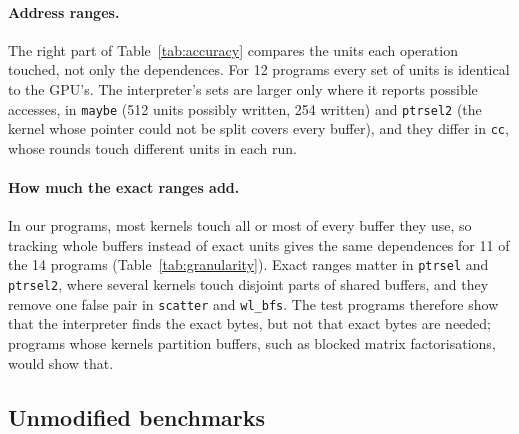 \documentclass[11pt]{article}
\newcommand{\tabref}[1]{Table~\ref{#1}}
\newcommand{\code}[1]{\texttt{#1}}
\begin{document}
\begin{table}[tbp]
\centering
\small

\caption{Dependences between two kernels (copies and fills excluded), and among them those through bytes reached by
an indirect access or under a data-dependent branch. The last two columns count how many of the latter the traced
run has. Programs with none are omitted.}
\label{tab:datadep}
\end{table}

\paragraph{Address ranges.} The right part of \tabref{tab:accuracy} compares the units each operation touched,
not only the dependences. For 12 programs every set of units is identical to the GPU's. The interpreter's sets
are larger only where it reports possible accesses, in \code{maybe} (512 units possibly written, 254 written) and
\code{ptrsel2} (the kernel whose pointer could not be split covers every buffer), and they differ in \code{cc},
whose rounds touch different units in each run.

\paragraph{How much the exact ranges add.} In our programs, most kernels touch all or most of every buffer they
use, so tracking whole buffers instead of exact units gives the same dependences for 11 of the 14 programs
(\tabref{tab:granularity}). Exact ranges matter in \code{ptrsel} and \code{ptrsel2}, where several kernels touch
disjoint parts of shared buffers, and they remove one false pair in \code{scatter} and \code{wl\_bfs}. The test
programs therefore show that the interpreter finds the exact bytes, but not that exact bytes are needed; programs
whose kernels partition buffers, such as blocked matrix factorisations, would show that.

\begin{table}[tbp]
\centering
\small

\caption{Pairs of operations that conflict in the traced run (both touch a unit and one writes it), and the needed
pairs among them, when each operation's touched units are taken exactly, as one interval per buffer, or as the
whole buffer.}
\label{tab:granularity}
\end{table}

\subsection{Unmodified benchmarks}
\label{sec:eval-bench}
\end{document}
